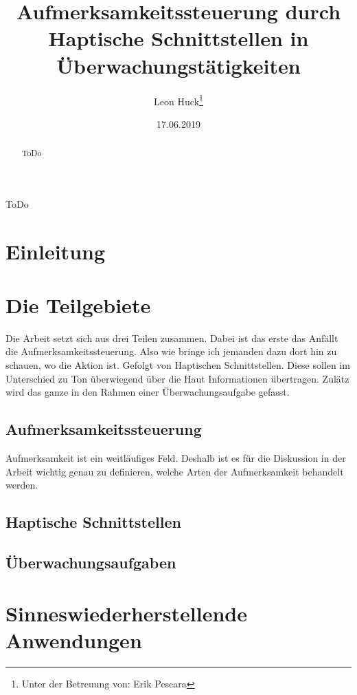 \documentclass{llncs}					%
\title{Aufmerksamkeitssteuerung durch Haptische Schnittstellen in Überwachungstätigkeiten}
\author{Leon Huck\thanks{Unter der Betreuung von: Erik Pescara}}
\institute{Karlsruher Institut für Technology}
\date{17.06.2019}
\begin{document}
	
\maketitle

\begin{description}
	\item ToDo
\end{description}

\begin{abstract}
	ToDo
\end{abstract}

\newpage
\tableofcontents
\newpage

\newpage
\section{Einleitung}

\section{Die Teilgebiete}
Die Arbeit setzt sich aus drei Teilen zusammen. Dabei ist das erste das Anfällt die Aufmerksamkeitssteuerung. Also wie bringe ich jemanden dazu dort hin zu schauen, wo die Aktion ist. Gefolgt von Haptischen Schnittstellen. Diese sollen im Unterschied zu Ton überwiegend über die Haut Informationen übertragen. Zulätz wird das ganze in den Rahmen einer Überwachungsaufgabe gefasst.

\subsection{Aufmerksamkeitssteuerung}
Aufmerksamkeit ist ein weitläufiges Feld. Deshalb ist es für die Diskussion in der Arbeit wichtig genau zu definieren, welche Arten der Aufmerksamkeit behandelt werden.
\subsection{Haptische Schnittstellen}
\subsection{Überwachungsaufgaben}

\section{Sinneswiederherstellende Anwendungen}
\end{document}
